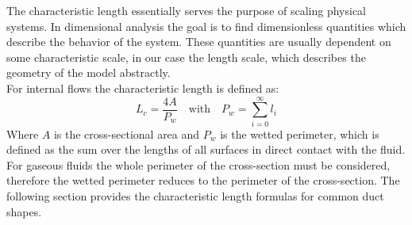 The characteristic length essentially serves the purpose of scaling physical systems.
In dimensional analysis the goal is to find dimensionless quantities which describe the behavior of the system.
These quantities are usually dependent on some characteristic scale, in our case the length scale, which describes the geometry of the model abstractly.\\
For internal flows the characteristic length is defined as:
$$
	L_c=\frac{4A}{P_w} \quad \text{with} \quad P_w = \sum^{\infty}_{i=0} l_i
$$
Where $A$ is the cross-sectional area and $P_w$ is the wetted perimeter, which is defined as the sum over the lengths of all surfaces in direct contact with the fluid.
For gaseous fluids the whole perimeter of the cross-section must be considered, therefore the wetted perimeter reduces to the perimeter of the cross-section.
The following section provides the characteristic length formulas for common duct shapes. 



